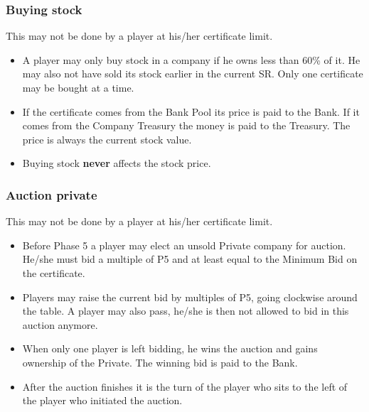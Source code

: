 \documentclass[a4paper,twocolumn]{article}
\begin{document}
\subsubsection{Buying stock}
This may not be done by a player at his/her certificate limit.
\begin{itemize}
	\item A player may only buy stock in a company if he owns less than 60\% of
	it. He may also not have sold its stock earlier in the current SR. Only one
	certificate may be bought at a time.
	\item If the certificate comes from the Bank Pool its price is paid to the
	Bank. If it comes from the Company Treasury the money is paid to the
	Treasury. The price is always the current stock value.
	\item Buying stock \textbf{never} affects the stock price.
\end{itemize}

\subsubsection{Auction private}\label{sec:auction}
This may not be done by a player at his/her certificate limit.
\begin{itemize}
	\item Before Phase 5 a player may elect an unsold Private company for
	auction. He/she must bid a multiple of P5 and at least equal to the Minimum
	Bid on the certificate.
	\item Players may raise the current bid by multiples of P5, going clockwise
	around the table. A player may also pass, he/she is then not allowed to bid
	in this auction anymore.
	\item When only one player is left bidding, he wins the auction and gains
	ownership of the Private. The winning bid is paid to the Bank.
	\item After the auction finishes it is the turn of the player who sits to
	the left of the player who initiated the auction.
\end{itemize}
\end{document}

